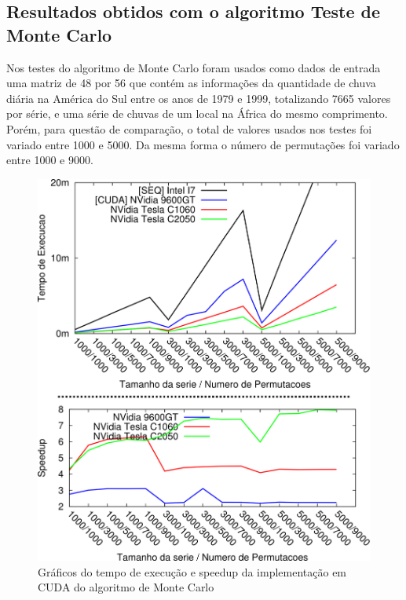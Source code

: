 \subsection{Resultados obtidos com o algoritmo Teste de Monte Carlo}

Nos testes do algoritmo de Monte Carlo foram usados como dados de entrada uma matriz de 48 por 56 que contém as informações da quantidade de chuva diária na América do Sul entre os anos de 1979 e 1999, totalizando 7665 valores por série, e uma série de chuvas de um local na África do mesmo comprimento.
Porém, para questão de comparação, o total de valores usados nos testes foi variado entre 1000 e 5000. Da mesma forma o número de permutações foi variado entre 1000 e 9000.

\begin{figure}[H]
\centering
\includegraphics[]{Imagens/graficos_mcarlo/mcarlo_cuda.png}
\caption{Gráficos do tempo de execução e speedup da implementação em CUDA do algoritmo de Monte Carlo}
\label{fig:graficos_mcarlo_cuda}
\end{figure}

